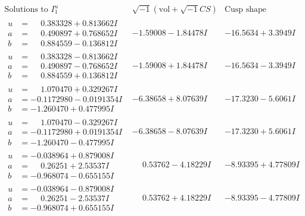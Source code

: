 \documentclass[1p]{elsarticle_modified}
\theoremstyle{definition}
\newcommand{\I}{\sqrt{-1}}
\begin{document}
$$\begin{array}{c|c|c}  
\text{Solutions to }I^u_{1}& \I (\text{vol} + \sqrt{-1}CS) & \text{Cusp shape}\\
 \hline 
\begin{aligned}
u &= \phantom{-}0.383328 + 0.813662 I \\
a &= \phantom{-}0.490897 + 0.768652 I \\
b &= \phantom{-}0.884559 - 0.136812 I\end{aligned}
 & -1.59008 - 1.84478 I & -16.5634 + 3.3949 I \\ \hline\begin{aligned}
u &= \phantom{-}0.383328 - 0.813662 I \\
a &= \phantom{-}0.490897 - 0.768652 I \\
b &= \phantom{-}0.884559 + 0.136812 I\end{aligned}
 & -1.59008 + 1.84478 I & -16.5634 - 3.3949 I \\ \hline\begin{aligned}
u &= \phantom{-}1.070470 + 0.329267 I \\
a &= -0.1172980 - 0.0191354 I \\
b &= -1.260470 + 0.477995 I\end{aligned}
 & -6.38658 + 8.07639 I & -17.3230 - 5.6061 I \\ \hline\begin{aligned}
u &= \phantom{-}1.070470 - 0.329267 I \\
a &= -0.1172980 + 0.0191354 I \\
b &= -1.260470 - 0.477995 I\end{aligned}
 & -6.38658 - 8.07639 I & -17.3230 + 5.6061 I \\ \hline\begin{aligned}
u &= -0.038964 + 0.879008 I \\
a &= \phantom{-}0.26251 + 2.53537 I \\
b &= -0.968074 - 0.655155 I\end{aligned}
 & \phantom{-}0.53762 - 4.18229 I & -8.93395 + 4.77809 I \\ \hline\begin{aligned}
u &= -0.038964 - 0.879008 I \\
a &= \phantom{-}0.26251 - 2.53537 I \\
b &= -0.968074 + 0.655155 I\end{aligned}
 & \phantom{-}0.53762 + 4.18229 I & -8.93395 - 4.77809 I \\ \hline\begin{aligned}

\end{aligned}
\end{array}$$
\end{document}
